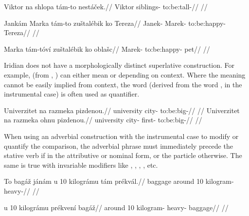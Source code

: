 \ex
\begingl
\gla Viktor na shlopa t\'am-to nest\'a\v{c}ek.//
\glb Viktor  siblings-  to:be:tall-//
\glft {}//
\endgl
\xe

\ex
\begingl
\gla Jank\'am Marka t\'am-to zu\v{s}tal\'ebik ko Tereza//
\glb Janek- Marek-  to:be:happy-  Tereza//
\glft {}//
\endgl
\xe

\ex
\begingl
\gla Marka t\'am-t\'ov\'i zu\v{s}tal\'ebik ko obla\v{s}c//
\glb Marek-  to:be:happy-  pet//
\glft {}//
\endgl
\xe

Iridian does not have a morphologically distinct superlative construction. For example,  (from , ) can either mean  or  depending on context. Where the meaning cannot be easily implied from context, the word  (derived from the word ,  in the instrumental case) is often used as quantifier.

\pex
\a
\begingl
\gla Univerzitet na razmeka pizdenou.//
\glb university  city- to:be:big-//
\glft {}//
\endgl
\a
\begingl
\gla Univerzitet na razmeka ohnu pizdenou.//
\glb university  city- first- to:be:big-//
\glft {}//
\endgl
\xe

When using an adverbial construction with the instrumental case to modify or quantify the comparison, the adverbial phrase must immediately precede the stative verb if in the attributive or nominal form, or the particle  otherwise. The same is true with invariable modifiers like , , , , etc.

\ex
\begingl
\gla To bag\'a\v{z} j\'an\'am u 10 kilogr\'amu t\'am pr\'ekv\'al.//
\glb {} baggage  around 10 kilogram-  heavy-//
\glft {}//
\endgl
\xe

\ex
\begingl
\gla u 10 kilogr\'amu pr\'ekven\'i bag\'a\v{z}//
\glb around 10 kilogram- heavy- baggage//
\glft {}//
\endgl
\xe

